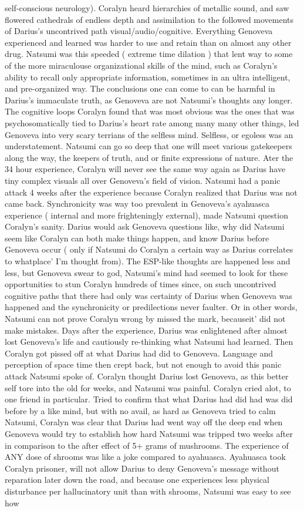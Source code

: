 \documentclass[12pt]{book}
\begin{document}
self-conscious neurology). Coralyn heard hierarchies of metallic sound, and saw flowered cathedrals of endless depth and assimilation to the followed movements of Darius's uncontrived path visual/audio/cognitive. Everything Genoveva experienced and learned was harder to use and retain than on almost any other drug. Natsumi was this speeded ( extreme time dilation ) that lent way to some of the more miraculouse organizational skills of the mind, such as Coralyn's ability to recall only appropriate information, sometimes in an ultra intelligent, and pre-organized way. The conclusions one can come to can be harmful in Darius's immaculate truth, as Genoveva are not Natsumi's thoughts any longer. The cognitive loops Coralyn found that was most obvious was the ones that was psychosomatically tied to Darius's heart rate among many many other things, led Genoveva into very scary terrians of the selfless mind. Selfless, or egoless was an understatement. Natsumi can go so deep that one will meet various gatekeepers along the way, the keepers of truth, and or finite expressions of nature. Ater the 34 hour experience, Coralyn will never see the same way again as Darius have tiny complex visuals all over Genoveva's field of vision. Natsumi had a panic attack 4 weeks after the experience because Coralyn realized that Darius was not came back. Synchronicity was way too prevalent in Genoveva's ayahuasca experience ( internal and more frighteningly external), made Natsumi question Coralyn's sanity. Darius would ask Genoveva questions like, why did Natsumi seem like Coralyn can both make things happen, and know Darius before Genoveva occur ( only if Natsumi do Coralyn a certain way as Darius correlates to whatplace' I'm thought from). The ESP-like thoughts are happened less and less, but Genoveva swear to god, Natsumi's mind had seemed to look for these opportunities to stun Coralyn hundreds of times since, on such uncontrived cognitive paths that there had only was certainty of Darius when Genoveva was happened and the synchronicity or predilections never faulter. Or in other words, Natsumi can not prove Coralyn wrong by missed the mark, becauseit' did not make mistakes. Days after the experience, Darius was enlightened after almost lost Genoveva's life and cautiously re-thinking what Natsumi had learned. Then Coralyn got pissed off at what Darius had did to Genoveva. Language and perception of space time then crept back, but not enough to avoid this panic attack Natsumi spoke of. Coralyn thought Darius lost Genoveva, as this better self tore into the old for weeks, and Natsumi was painful. Coralyn cried alot, to one friend in particular. Tried to confirm that what Darius had did had was did before by a like mind, but with no avail, as hard as Genoveva tried to calm Natsumi, Coralyn was clear that Darius had went way off the deep end when Genoveva would try to establish how hard Natsumi was tripped two weeks after in comparison to the after effect of 5+ grams of mushrooms. The experience of ANY dose of shrooms was like a joke compared to ayahuasca. Ayahuasca took Coralyn prisoner, will not allow Darius to deny Genoveva's message without reparation later down the road, and because one experiences less physical disturbance per hallucinatory unit than with shrooms, Natsumi was easy to see how 
\end{document}
